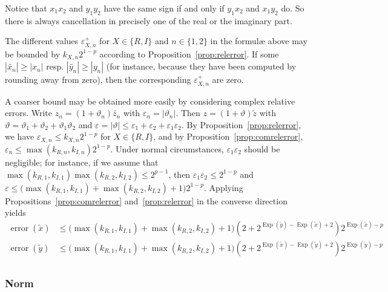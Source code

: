 \documentclass [12pt]{article}
\newcommand {\corr}[1]{{#1}}
\newcommand {\appro}[1]{\widetilde {#1}}
\DeclareMathOperator{\Exp}{\operatorname {Exp}}
\newcommand{\error}{\operatorname {error}}
\renewcommand {\epsilon}{\varepsilon}
\renewcommand {\theta}{\vartheta}
\renewcommand {\leq}{\leqslant}
\renewcommand {\geq}{\geqslant}
\begin{document}
Notice that $x_1 x_2$ and $y_1 y_2$ have the same sign
if and only if $y_1 x_2$ and $x_1 y_2$ do. So there is
always cancellation in precisely one of the real or the imaginary part.

The different values $\epsilon_{X, n}^+$ for $X \in \{ R, I \}$ and
$n \in \{ 1, 2 \}$ in the formul{\ae} above may be bounded by
$k_{X, n} 2^{1 - p}$ according to Proposition~\ref {prop:relerror}.
If some $|\appro {x_n}| \geq |\corr {x_n}|$ resp.
$|\appro {y_n}| \geq |\corr {y_n}|$ (for instance, because they have been
computed by rounding away from zero), then the corresponding
$\epsilon_{X, n}^+$ are zero.


A coarser bound may be obtained more easily by considering complex
relative errors. Write $\corr {z_n} = (1 + \theta_n) \appro {z_n}$
with $\epsilon_n = | \theta_n |$. Then $\corr z = (1 + \theta) \appro z$
with $\theta = \theta_1 + \theta_2 + \theta_1 \theta_2$ and
$\epsilon = |\theta| \leq \epsilon_1 + \epsilon_2 + \epsilon_1 \epsilon_2$.
By Proposition~\ref {prop:relerror},
we have $\epsilon_{X, n} \leq k_{X, n} 2^{1-p}$ for $X \in \{ R, I \}$,
and by Proposition~\ref {prop:comrelerror},
$\epsilon_n \leq  \max (k_{R, n}, k_{I, n}) 2^{1 - p}$.
Under normal circumstances, $\epsilon_1 \epsilon_2$ should be negligible;
for instance, if we assume that
$\max (k_{R, 1}, k_{I, 1}) \max (k_{R, 2}, k_{I, 2}) \leq 2^{p - 1}$,
then $\epsilon_1 \epsilon_2 \leq 2^{1-p}$ and
$\epsilon \leq \big( \max (k_{R, 1}, k_{I, 1}) + \max (k_{R, 2}, k_{I, 2}) + 1
\big) 2^{1 - p}$.
Applying Propositions~\ref {prop:comrelerror} and~\ref {prop:relerror}
in the converse direction yields
\begin {equation}
\label {eq:propmulcomrel}
\begin {array}{rl}
\error (\appro x)
&\leq \big( \max (k_{R, 1}, k_{I, 1}) + \max (k_{R, 2}, k_{I, 2}) + 1 \big)
\left( 2 + 2^{\Exp (\appro y) - \Exp (\appro x) + 2} \right)
2^{\Exp (\appro x) - p} \\
\error (\appro y)
&\leq \big( \max (k_{R, 1}, k_{I, 1}) + \max (k_{R, 2}, k_{I, 2}) + 1 \big)
\left( 2 + 2^{\Exp (\appro x) - \Exp (\appro y) + 2} \right)
2^{\Exp (\appro y) - p} \\
\end {array}
\end {equation}


\subsubsection {Norm}
\label {sssec:propnorm}
\end{document}
